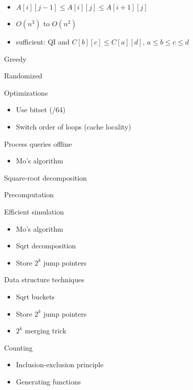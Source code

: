 \begin{myitemize}
\begin{itemize}
\begin{itemize}
\begin{itemize}
                      \item $A[i][j-1] \leq A[i][j] \leq A[i+1][j]$
                      \item $O(n^3)$ to $O(n^2)$
                      \item sufficient: QI and $C[b][c] \leq C[a][d]$, $a\leq b\leq c\leq d$
                    \end{itemize}
                \end{itemize}
          \end{itemize}
        \item Greedy
        \item Randomized
        \item Optimizations
          \begin{itemize}
            \item Use bitset (/64)
            \item Switch order of loops (cache locality)
          \end{itemize}
        \item Process queries offline
          \begin{itemize}
            \item Mo's algorithm
          \end{itemize}
        \item Square-root decomposition
        \item Precomputation
        \item Efficient simulation
          \begin{itemize}
            \item Mo's algorithm
            \item Sqrt decomposition
            \item Store $2^k$ jump pointers
          \end{itemize}
        \item Data structure techniques
          \begin{itemize}
            \item Sqrt buckets
            \item Store $2^k$ jump pointers
            \item $2^k$ merging trick
          \end{itemize}
        \item Counting
          \begin{itemize}
            \item Inclusion-exclusion principle
            \item Generating functions

\end{itemize}
\end{myitemize}
